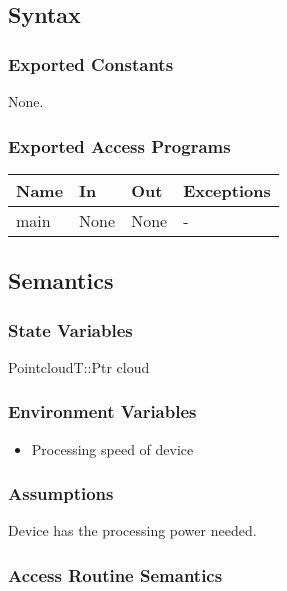 \documentclass[12pt, titlepage]{article}
\begin{document}
\subsection{Syntax}

\subsubsection{Exported Constants}

None.

\subsubsection{Exported Access Programs}

\begin{center}
\begin{tabular}{p{2cm} p{4cm} p{4cm} p{2cm}}
\hline
\textbf{Name} & \textbf{In} & \textbf{Out} & \textbf{Exceptions} \\
\hline
main & None & None & - \\
\hline
\end{tabular}
\end{center}

\subsection{Semantics}

\subsubsection{State Variables}

PointcloudT::Ptr cloud 

\subsubsection{Environment Variables}

\begin{itemize}
\item Processing speed of device
\end{itemize}

\subsubsection{Assumptions}

Device has the processing power needed.

\subsubsection{Access Routine Semantics}
\end{document}
